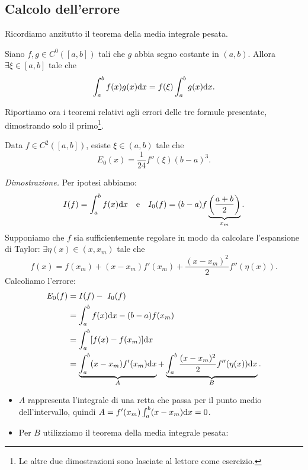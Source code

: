 \subsection{Calcolo dell'errore}
Ricordiamo anzitutto il teorema della media integrale pesata.
\begin{theorem}
Siano $f,g\in C^{0}([ a,b])$ tali che $g$ abbia segno costante in $( a,b)$.
Allora $\exists \xi \in [ a,b]$ tale che
\begin{equation*}
\int\nolimits ^{b}_{a} f(x) g(x) \mathrm d x=f( \xi )\int\nolimits ^{b}_{a} g(x) \mathrm d x.
\end{equation*}
\end{theorem}
Riportiamo ora i teoremi relativi agli errori delle tre formule presentate, dimostrando solo il primo\footnote{Le altre due dimostrazioni sono lasciate al lettore come esercizio.}.
\begin{theorem}
Data $f\in C^{2}([ a,b])$, esiste $\xi \in ( a,b)$ tale che
\begin{equation*}
E_{0}(x) =\frac{1}{24} f''( \xi )( b-a)^{3}.
\end{equation*}
\end{theorem}
\textit{Dimostrazione.}
Per ipotesi abbiamo:
\begin{equation*}
I(f) =\int\nolimits ^{b}_{a} f(x) \mathrm d x \quad \text e \quad I_{0}(f) =( b-a) f\underbrace{\left(\frac{a+b}{2}\right)}_{x_{m}}.
\end{equation*}
Supponiamo che $f$ sia sufficientemente regolare in modo da calcolare l'espansione di Taylor: $\exists \eta (x) \in ( x,x_{m})$ tale che
\begin{equation*}
f(x) =f( x_{m}) +( x-x_{m}) f'( x_{m}) +\frac{( x-x_{m})^{2}}{2} f''( \eta (x)).
\end{equation*}
Calcoliamo l'errore:
\begin{align*}
E_{0}(f) &= I(f) -\ I_{0}(f) \\
  &=\int\nolimits ^{b}_{a} f(x) \mathrm d x-( b-a) f( x_{m})\\
  &=\int\nolimits ^{b}_{a}[ f(x) -f( x_{m})] \mathrm d x\\
  &=\underbrace{\int\nolimits ^{b}_{a}( x-x_{m}) f'( x_{m}) \mathrm d x}_{A} +\underbrace{\int\nolimits ^{b}_{a}\frac{( x-x_{m})^{2}}{2} f''( \eta (x)) \mathrm d x}_{B}.
\end{align*}
\begin{itemize}
\item $A$ rappresenta l'integrale di una retta che passa per il punto medio dell'intervallo, quindi $A=f'( x_{m})\int\nolimits ^{b}_{a}( x-x_{m}) \mathrm d x=0$.
\item Per $B$ utilizziamo il teorema della media integrale pesata:
\end{itemize}
